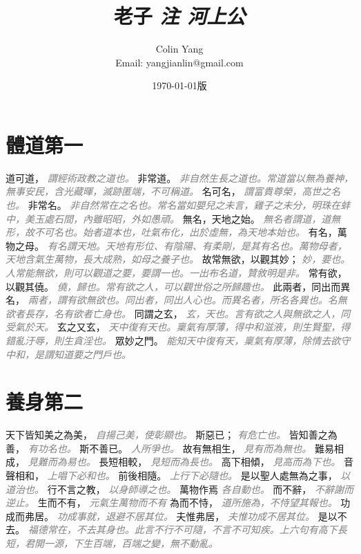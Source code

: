 \documentclass[a4paper,zihao=-4,oneside,landscape,UTF8]{ctexart}
\title{\textbf{老子}\textit{ 注 \hspace{5em}河上公}\hfil}
\author{Colin Yang \\Email: yangjianlin@gmail.com}
\date{\normalsize\today 版}
\newcommand{\zhushi}[1]{\scriptsize{\textit{\textcolor{gray}{#1}}}\normalsize}
\begin{document}
\large

\maketitle


\section{體道第一}


道可道，
\zhushi{謂經術政教之道也。}
非常道。
\zhushi{非自然生長之道也。常道當以無為養神，無事安民，含光藏暉，滅跡匿端，不可稱道。}
名可名，
\zhushi{謂富貴尊榮，高世之名也。}
非常名。
\zhushi{非自然常在之名也。常名當如嬰兒之未言，雞子之未分，明珠在蚌中，美玉處石間，內雖昭昭，外如愚頑。}
無名，天地之始。
\zhushi{無名者謂道，道無形，故不可名也。始者道本也，吐氣布化，出於虛無，為天地本始也。}
有名，萬物之母。
\zhushi{有名謂天地。天地有形位、有陰陽、有柔剛，是其有名也。萬物母者，天地含氣生萬物，長大成熟，如母之養子也。}
故常無欲，以觀其妙；
\zhushi{妙，要也。人常能無欲，則可以觀道之要，要謂一也。一出布名道，贊敘明是非。}
常有欲，以觀其僥。
\zhushi{僥，歸也。常有欲之人，可以觀世俗之所歸趣也。}
此兩者，同出而異名，
\zhushi{兩者，謂有欲無欲也。同出者，同出人心也。而異名者，所名各異也。名無欲者長存，名有欲者亡身也。}
同謂之玄，
\zhushi{玄，天也。言有欲之人與無欲之人，同受氣於天。}
玄之又玄，
\zhushi{天中復有天也。稟氣有厚薄，得中和滋液，則生賢聖，得錯亂汙辱，則生貪淫也。}
眾妙之門。
\zhushi{能知天中復有天，稟氣有厚薄，除情去欲守中和，是謂知道要之門戶也。}


\section{養身第二}

天下皆知美之為美，
\zhushi{自揚己美，使彰顯也。}
斯惡已；
\zhushi{有危亡也。}
皆知善之為善，
\zhushi{有功名也。}
斯不善已。
\zhushi{人所爭也。}
故有無相生，
\zhushi{見有而為無也。}
難易相成，
\zhushi{見難而為易也。}
長短相較，
\zhushi{見短而為長也。}
高下相傾，
\zhushi{見高而為下也。}
音聲相和，
\zhushi{上唱下必和也。}
前後相隨。
\zhushi{上行下必隨也。}
是以聖人處無為之事，
\zhushi{以道治也。}
行不言之教，
\zhushi{以身師導之也。}
萬物作焉
\zhushi{各自動也。}
而不辭，
\zhushi{不辭謝而逆止。}
生而不有，
\zhushi{元氣生萬物而不有}
為而不恃，
\zhushi{道所施為，不恃望其報也。}
功成而弗居。
\zhushi{功成事就，退避不居其位。}
夫惟弗居，
\zhushi{夫惟功成不居其位。}
是以不去。
\zhushi{福德常在，不去其身也。此言不行不可隨，不言不可知疾。上六句有高下長短，君開一源，下生百端，百端之變，無不動亂。}
\end{document}
